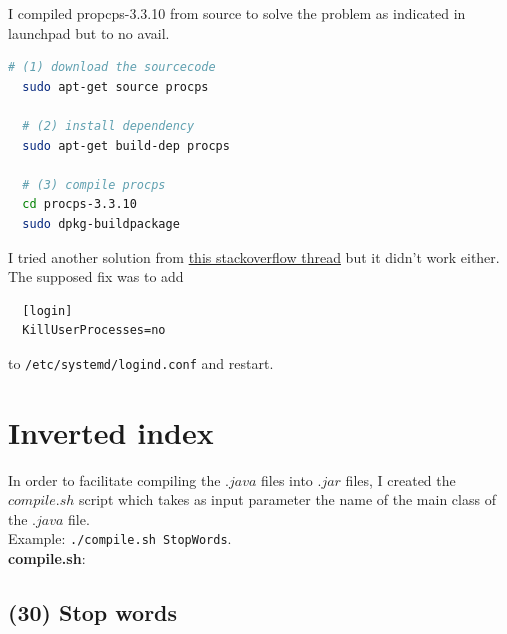 \documentclass[a4paper,12pt]{article}
\begin{document}
I compiled propcps-3.3.10 from source to solve the problem as indicated in launchpad but to no avail.
\begin{lstlisting}[language=bash]
  # (1) download the sourcecode
  sudo apt-get source procps

  # (2) install dependency
  sudo apt-get build-dep procps

  # (3) compile procps
  cd procps-3.3.10
  sudo dpkg-buildpackage
\end{lstlisting}


I tried another solution from \href{http://stackoverflow.com/questions/38419078/logouts-while-running-hadoop-under-ubuntu-16-04}{this stackoverflow thread} but it didn't work either.
The supposed fix was to add
\begin{lstlisting}
  [login]
  KillUserProcesses=no
\end{lstlisting}
to \lstinline{/etc/systemd/logind.conf} and restart.


\section{Inverted index}

In order to facilitate compiling the $.java$ files into $.jar$ files, I created
the $compile.sh$ script which takes as input parameter the name of the main class of the $.java$ file.
\\Example: \lstinline{./compile.sh StopWords}.
\\ \textbf{compile.sh}:


\subsection{(30) Stop words}
\end{document}
